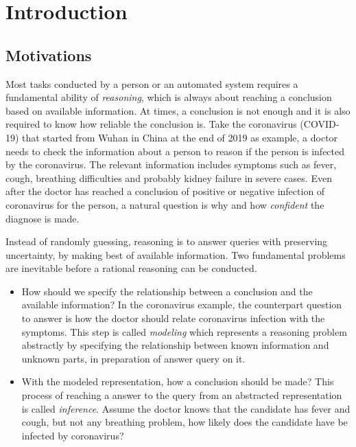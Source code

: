 \chapter{Introduction}
\label{chapter1}

\section{Motivations}
\label{section1.1}

Most tasks conducted by a person or an automated system requires a fundamental ability of \textit{reasoning}, which is always about reaching a conclusion based on available information. At times, a conclusion is not enough and it is also required to know how reliable the conclusion is. Take the coronavirus (COVID-19) that started from Wuhan in China at the end of 2019 as example, a doctor needs to check the information about a person to reason if the person is infected by the coronavirus. The relevant information includes symptoms such as fever, cough, breathing difficulties and probably kidney failure in severe cases. Even after the doctor has reached a conclusion of positive or negative infection of coronavirus for the person, a natural question is why and how \textit{confident} the diagnose is made.

Instead of randomly guessing, reasoning is to answer queries with preserving uncertainty, by making best of available information. Two fundamental problems are inevitable before a rational reasoning can be conducted. 
\begin{itemize}
\item How should we specify the relationship between a conclusion and the available information? In the coronavirus example, the counterpart question to answer is how the doctor should relate coronavirus infection with the symptoms. This step is called \textit{modeling} which represents a reasoning problem abstractly by specifying the relationship between known information and unknown parts, in preparation of answer query on it.
\item With the modeled representation, how a conclusion should be made? This process of reaching a answer to the query from an abstracted representation is called \textit{inference}. Assume the doctor knows that the candidate has fever and cough, but not any breathing problem, how likely does the candidate have be infected by coronavirus?
\end{itemize}

